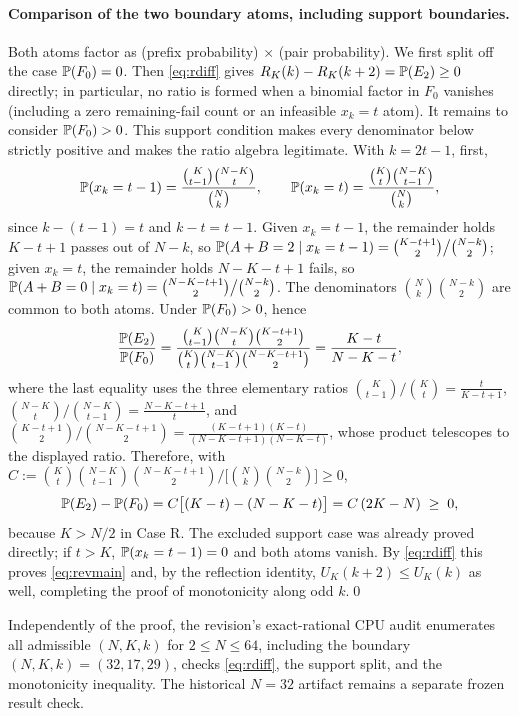 \paragraph{Comparison of the two boundary atoms, including support boundaries.}
Both atoms factor as (prefix probability) $\times$ (pair probability).  We
first split off the case $\P(F_0)=0$.  Then \eqref{eq:rdiff} gives
$R_K(k)-R_K(k+2)=\P(E_2)\ge0$ directly; in particular, no ratio is formed
when a binomial factor in $F_0$ vanishes (including a zero remaining-fail
count or an infeasible $x_k=t$ atom).  It remains to consider
$\P(F_0)>0$.  This support condition makes every denominator below strictly
positive and makes the ratio algebra legitimate. With $k=2t-1$, first,
\[
\P(x_k=t-1)=\frac{\binom{K}{t-1}\binom{N-K}{t}}{\binom{N}{k}},
\qquad
\P(x_k=t)=\frac{\binom{K}{t}\binom{N-K}{t-1}}{\binom{N}{k}},
\]
since $k-(t-1)=t$ and $k-t=t-1$. Given $x_k=t-1$, the remainder holds
$K-t+1$ passes out of $N-k$, so
$\P(A+B=2\mid x_k=t-1)=\binom{K-t+1}{2}\big/\binom{N-k}{2}$; given $x_k=t$,
the remainder holds $N-K-t+1$ fails, so
$\P(A+B=0\mid x_k=t)=\binom{N-K-t+1}{2}\big/\binom{N-k}{2}$. The
denominators $\binom{N}{k}\binom{N-k}{2}$ are common to both atoms. Under
$\P(F_0)>0$, hence
\[
\frac{\P(E_2)}{\P(F_0)}
=\frac{\binom{K}{t-1}\binom{N-K}{t}\binom{K-t+1}{2}}
{\binom{K}{t}\binom{N-K}{t-1}\binom{N-K-t+1}{2}}
=\frac{K-t}{N-K-t},
\]
where the last equality uses the three elementary ratios
$\binom{K}{t-1}\big/\binom{K}{t}=\frac{t}{K-t+1}$,
$\binom{N-K}{t}\big/\binom{N-K}{t-1}=\frac{N-K-t+1}{t}$, and
$\binom{K-t+1}{2}\big/\binom{N-K-t+1}{2}=\frac{(K-t+1)(K-t)}{(N-K-t+1)(N-K-t)}$,
whose product telescopes to the displayed ratio. Therefore, with
$C:=\binom{K}{t}\binom{N-K}{t-1}\binom{N-K-t+1}{2}\big/
\big[\binom{N}{k}\binom{N-k}{2}\big]\ge 0$,
\begin{equation}
\label{eq:atomdiff}
\P(E_2)-\P(F_0)=C\big[(K-t)-(N-K-t)\big]=C\,(2K-N)\;\ge\;0,
\end{equation}
because $K>N/2$ in Case R.  The excluded support case was already proved
directly; if $t>K$, $\P(x_k=t-1)=0$ and both atoms vanish. By \eqref{eq:rdiff}
this proves \eqref{eq:revmain} and, by the
reflection identity, $U_K(k+2)\le U_K(k)$ as well, completing the proof of
monotonicity along odd $k$.\qed

\begin{remark}[Verification at $N=32$]
Independently of the proof, the revision's exact-rational CPU audit enumerates
all admissible $(N,K,k)$ for $2\le N\le64$, including the boundary
$(N,K,k)=(32,17,29)$, checks \eqref{eq:rdiff}, the support split, and the
monotonicity inequality.  The historical $N=32$ artifact remains a separate
frozen result check.
\end{remark}


